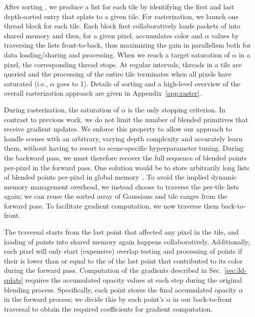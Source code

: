 After sorting , we produce a list for each tile by identifying the first and last depth-sorted entry that splats to a given tile. For rasterization, we launch one thread block for each tile. Each block first collaboratively loads packets of  into shared memory and then, for a given pixel, accumulates color and $\alpha$ values by traversing the lists front-to-back, thus maximizing the gain in parallelism both for data loading/sharing and processing.
When we reach a target saturation of $\alpha$ in a pixel, the corresponding thread stops. At regular intervals, threads in a tile are queried and the processing of the entire tile terminates when all pixels have saturated (i.e., $\alpha$ goes to 1). %
Details of sorting and a high-level overview of the overall rasterization approach are given in Appendix~\ref{app:raster}.

During rasterization, the saturation of $\alpha$ is the only stopping criterion. In contrast to previous work, we do not limit the number of blended primitives that receive gradient updates. We enforce this property to allow our approach to handle scenes with an arbitrary, varying depth complexity and accurately learn them, without having to resort to scene-specific hyperparameter tuning.
During the backward pass, we must therefore recover the full sequence of blended points per-pixel in the forward pass. One solution would be to store arbitrarily long lists of blended points per-pixel in global memory~\cite{kopanas21}. To avoid the implied dynamic memory management overhead, we instead choose to traverse the per-tile lists again; we can reuse the sorted array of Gaussians and tile ranges from the forward pass. To facilitate gradient computation, we now traverse them back-to-front.

The traversal starts from the last point that affected any pixel in the tile, and loading of points into shared memory again happens collaboratively. Additionally, each pixel will only start (expensive) overlap testing and processing of points if their  is lower than or equal to the  of the last point that contributed to its color during the forward pass.
Computation of the gradients described in Sec.~\ref{sec:3d-splats} requires the accumulated opacity values at each step during the original blending process.
Specifically, each point stores the final accumulated opacity $\alpha$ in the forward process; we divide this by each point's $\alpha$ in our back-to-front traversal to obtain the required coefficients for gradient computation.
